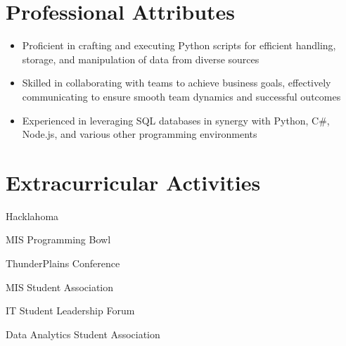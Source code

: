 \documentclass[letterpaper]{resumeconfig}
\begin{document}
\section{Professional Attributes}
\begin{itemize}
    \item Proficient in crafting and executing Python scripts for efficient handling, storage, and manipulation of data from diverse sources
    \vspace{-0.5em}
    \item Skilled in collaborating with teams to achieve business goals, effectively communicating to ensure smooth team dynamics and successful outcomes
    \vspace{-0.5em}
    \item Experienced in leveraging SQL databases in synergy with Python, C\#, Node.js, and various other programming environments
\end{itemize}

\section{Extracurricular Activities}

    \begin{ActivitiesList}
        \item Hacklahoma
        \item MIS Programming Bowl
        \item ThunderPlains Conference
        \item MIS Student Association
        \item IT Student Leadership Forum
        \item Data Analytics Student Association
    \end{ActivitiesList}
\end{document}
